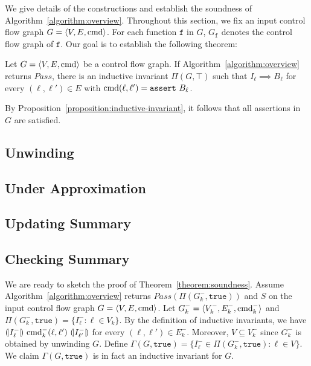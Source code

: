 
We give details of the constructions and establish the soundness of
Algorithm~\ref{algorithm:overview}. Throughout this section, we fix an
input control flow graph $G = \langle V, E, \textmd{cmd} \rangle$. For
each function $\mathtt{f}$ in $G$, $G_{\mathtt{f}}$ denotes the
control flow graph of $\mathtt{f}$. Our goal is to establish the
following theorem:

\begin{theorem}
  Let $G = \langle V, E, \textmd{cmd} \rangle$ be a control flow
  graph. If Algorithm~\ref{algorithm:overview} returns
  $\mathit{Pass}$, there is an inductive invariant $\Pi (G, \top)$
  such that $I_{\ell} \implies B_{\ell}$ for every $(\ell, \ell') \in
  E$ with $\textmd{cmd} (\ell, \ell') = \mathtt{assert\ } B_{\ell}$.
  \label{theorem:soundness}
\end{theorem}

By Proposition~\ref{proposition:inductive-invariant}, it follows that
all assertions in $G$ are satisfied.

\subsection{Unwinding}
\label{subsection:unwinding}


\subsection{Under Approximation}
\label{subsection:under-approximation}


\subsection{Updating Summary}
\label{subsection:updating-summary}


\subsection{Checking Summary}
\label{subsection:checking-summary}


We are ready to sketch the proof of Theorem~\ref{theorem:soundness}. 
Assume Algorithm~\ref{algorithm:overview} returns $\mathit{Pass} (\Pi
(G^-_k, \mathtt{true}))$ and $S$ on the input control flow graph $G =
\langle V, E, \textmd{cmd} \rangle$. Let $G^-_k = \langle V^-_k, E^-_k,
\textmd{cmd}^-_k \rangle$ and $\Pi (G^-_k, \mathtt{true}) = \{ I^-_{\ell}
: \ell \in V_k \}$. By the definition of inductive invariants, we have
$(\!| {I^-_{\ell}} |\!)\ \textmd{cmd}^-_k (\ell, \ell')\ (\!| {I^-_{\ell'}} |\!)$
for every $(\ell, \ell') \in E^-_k$. Moreover, $V \subseteq V^-_k$ since
$G^-_k$ is obtained by unwinding $G$. Define 
$\Gamma (G, \mathtt{true}) = \{ I^-_{\ell} \in \Pi (G^-_k,
\mathtt{true}) : \ell \in V \}$. We claim $\Gamma (G, \mathtt{true})$
is in fact an inductive invariant for $G$. 

